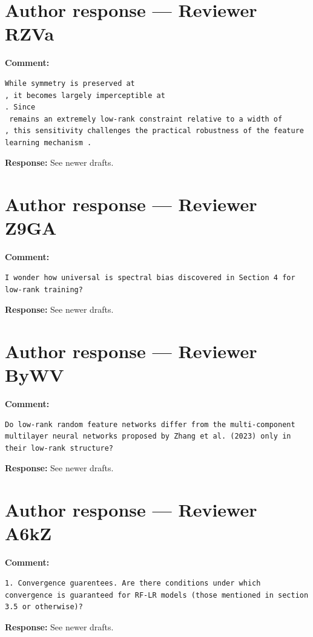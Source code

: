 \documentclass[11pt,a4paper]{article}
\begin{document}
\section*{Author response --- Reviewer RZVa}
\textbf{Comment:}
\begin{verbatim}
While symmetry is preserved at 
, it becomes largely imperceptible at 
. Since 
 remains an extremely low-rank constraint relative to a width of 
, this sensitivity challenges the practical robustness of the feature learning mechanism .
\end{verbatim}
\textbf{Response:} See newer drafts.

\section*{Author response --- Reviewer Z9GA}
\textbf{Comment:}
\begin{verbatim}
I wonder how universal is spectral bias discovered in Section 4 for low-rank training?
\end{verbatim}
\textbf{Response:} See newer drafts.

\section*{Author response --- Reviewer ByWV}
\textbf{Comment:}
\begin{verbatim}
Do low-rank random feature networks differ from the multi-component multilayer neural networks proposed by Zhang et al. (2023) only in their low-rank structure?
\end{verbatim}
\textbf{Response:} See newer drafts.

\section*{Author response --- Reviewer A6kZ}
\textbf{Comment:}
\begin{verbatim}
1. Convergence guarentees. Are there conditions under which convergence is guaranteed for RF-LR models (those mentioned in section 3.5 or otherwise)?
\end{verbatim}
\textbf{Response:} See newer drafts.
\end{document}
